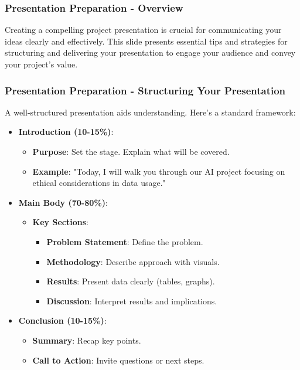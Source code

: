 \documentclass[aspectratio=169]{beamer}
\begin{document}
\begin{frame}[fragile]
  \frametitle{Presentation Preparation - Overview}
  Creating a compelling project presentation is crucial for communicating your ideas clearly and effectively. This slide presents essential tips and strategies for structuring and delivering your presentation to engage your audience and convey your project's value.
\end{frame}

\begin{frame}[fragile]
  \frametitle{Presentation Preparation - Structuring Your Presentation}
  A well-structured presentation aids understanding. Here’s a standard framework:

  \begin{itemize}
    \item \textbf{Introduction (10-15\%)}:
    \begin{itemize}
      \item \textbf{Purpose}: Set the stage. Explain what will be covered.
      \item \textbf{Example}: "Today, I will walk you through our AI project focusing on ethical considerations in data usage."
    \end{itemize}
    
    \item \textbf{Main Body (70-80\%)}:
    \begin{itemize}
      \item \textbf{Key Sections}:
      \begin{itemize}
        \item \textbf{Problem Statement}: Define the problem.
        \item \textbf{Methodology}: Describe approach with visuals.
        \item \textbf{Results}: Present data clearly (tables, graphs).
        \item \textbf{Discussion}: Interpret results and implications.
      \end{itemize}
    \end{itemize}
    
    \item \textbf{Conclusion (10-15\%)}:
    \begin{itemize}
      \item \textbf{Summary}: Recap key points.
      \item \textbf{Call to Action}: Invite questions or next steps.
    \end{itemize}
  \end{itemize}
\end{frame}
\end{document}
